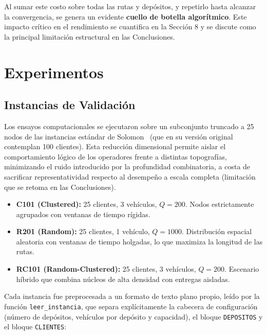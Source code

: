\documentclass[letter, 10pt]{article}
\begin{document}
Al sumar este costo sobre todas las rutas y dep\'ositos, y repetirlo hasta alcanzar la convergencia, se genera un evidente \textbf{cuello de botella algor\'itmico}. Este impacto cr\'itico en el rendimiento se cuantifica en la Secci\'on 8 y se discute como la principal limitaci\'on estructural en las Conclusiones.

\section{Experimentos}

\subsection{Instancias de Validaci\'on}

Los ensayos computacionales se ejecutaron sobre un subconjunto truncado a 25 nodos de las instancias est\'andar de Solomon~\cite{solomon1987algorithms} (que en su versi\'on original contemplan 100 clientes). Esta reducci\'on dimensional permite aislar el comportamiento l\'ogico de los operadores frente a distintas topograf\'ias, minimizando el ruido introducido por la profundidad combinatoria, a costa de sacrificar representatividad respecto al desempe\~no a escala completa (limitaci\'on que se retoma en las Conclusiones).

\begin{itemize}
\item \textbf{C101 (Clustered):} 25 clientes, 3 veh\'iculos, $Q = 200$. Nodos estrictamente agrupados con ventanas de tiempo r\'igidas.
\item \textbf{R201 (Random):} 25 clientes, 1 veh\'iculo, $Q = 1000$. Distribuci\'on espacial aleatoria con ventanas de tiempo holgadas, lo que maximiza la longitud de las rutas.
\item \textbf{RC101 (Random-Clustered):} 25 clientes, 3 veh\'iculos, $Q = 200$. Escenario h\'ibrido que combina n\'ucleos de alta densidad con entregas aisladas.
\end{itemize}

Cada instancia fue preprocesada a un formato de texto plano propio, le\'ido por la funci\'on \texttt{leer\_instancia}, que separa expl\'icitamente la cabecera de configuraci\'on (n\'umero de dep\'ositos, veh\'iculos por dep\'osito y capacidad), el bloque \texttt{DEPOSITOS} y el bloque \texttt{CLIENTES}:
\end{document}
